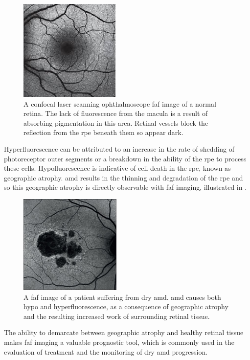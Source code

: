 \begin{figure}[H]
\centering
\includegraphics{figures/faf}
\caption{A confocal \gls{laser} scanning ophthalmoscope \Gls{faf} image of a normal retina. The lack of fluorescence from the macula is a result of absorbing pigmentation in this area. Retinal vessels block the reflection from the \Gls{rpe} beneath them so appear dark.\cite{1_optos.com_2015}}
\label{fig:faf}
   \end{figure}

Hyperfluorescence can be attributed to an increase in the rate
of shedding of photoreceptor outer segments or a breakdown in
the ability of the \Gls{rpe} to process these cells. Hypofluorescence
is indicative of cell death in the \Gls{rpe}, known as geographic atrophy.
\Gls{amd} results in the thinning and degradation of the \Gls{rpe} and 
so this geographic atrophy is directly observable with \gls{faf} imaging,
illustrated in .

\begin{figure}[H]
\centering
\includegraphics{figures/fafamd}
\caption{A \gls{faf} image of a patient suffering from dry \gls{amd}. \gls{amd} causes both hypo and hyperfluorescence, as a consequence of geographic atrophy and the resulting increased work of surrounding retinal tissue.\cite{2_audo_2015}}
\label{fig:fafamd}
   \end{figure}

The ability to demarcate between geographic atrophy and healthy retinal tissue makes \gls{faf} imaging a valuable prognostic tool, which is commonly used in the evaluation of treatment and the monitoring of dry \gls{amd} progression.\cite{1_murphy_2015}

